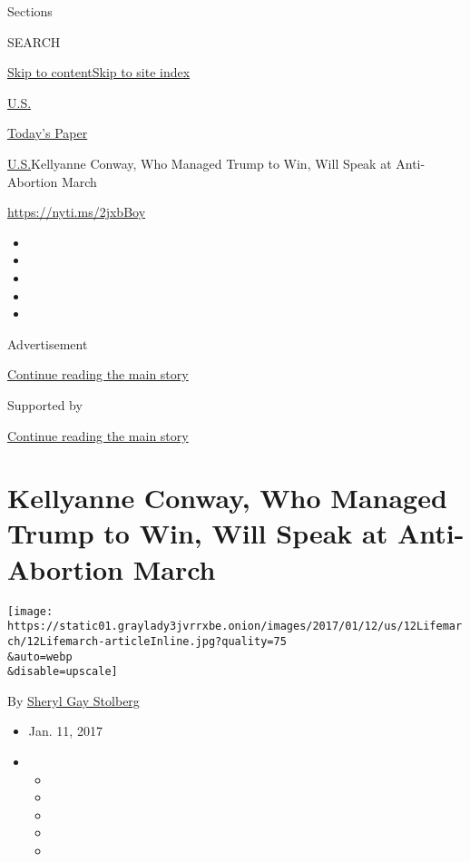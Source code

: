 Sections

SEARCH

\protect\hyperlink{site-content}{Skip to
content}\protect\hyperlink{site-index}{Skip to site index}

\href{https://www.nytimes3xbfgragh.onion/section/us}{U.S.}

\href{https://myaccount.nytimes3xbfgragh.onion/auth/login?response_type=cookie\&client_id=vi}{}

\href{https://www.nytimes3xbfgragh.onion/section/todayspaper}{Today's
Paper}

\href{/section/us}{U.S.}\textbar{}Kellyanne Conway, Who Managed Trump to
Win, Will Speak at Anti-Abortion March

\url{https://nyti.ms/2jxbBoy}

\begin{itemize}
\item
\item
\item
\item
\item
\end{itemize}

Advertisement

\protect\hyperlink{after-top}{Continue reading the main story}

Supported by

\protect\hyperlink{after-sponsor}{Continue reading the main story}

\hypertarget{kellyanne-conway-who-managed-trump-to-win-will-speak-at-anti-abortion-march}{%
\section{Kellyanne Conway, Who Managed Trump to Win, Will Speak at
Anti-Abortion
March}\label{kellyanne-conway-who-managed-trump-to-win-will-speak-at-anti-abortion-march}}

\texttt{[image: https://static01.graylady3jvrrxbe.onion/images/2017/01/12/us/12Lifemarch/12Lifemarch-articleInline.jpg?quality=75\\\&auto=webp\\\&disable=upscale]}

By
\href{http://www.nytimes3xbfgragh.onion/by/sheryl-gay-stolberg}{Sheryl
Gay Stolberg}

\begin{itemize}
\item
  Jan. 11, 2017
\item
  \begin{itemize}
  \item
  \item
  \item
  \item
  \item
  \end{itemize}
\end{itemize}

